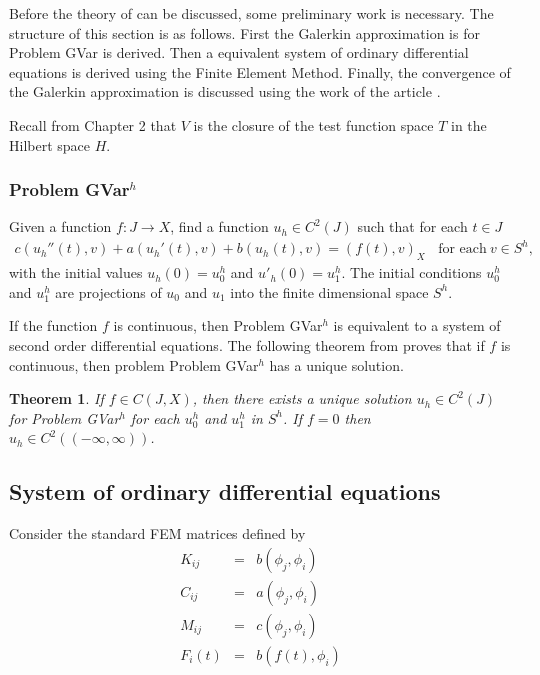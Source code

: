 \documentclass[../../main.tex]{subfiles}
\begin{document}
Before the theory of \cite{BV13} can be discussed, some preliminary work is
necessary. The structure of this section is as follows. First the Galerkin
approximation is for Problem GVar is derived. Then a equivalent system of
ordinary differential equations is derived using the Finite Element Method.
Finally, the convergence of the Galerkin approximation is discussed using the
work of the article \cite{BV13}.

Recall from Chapter 2 that $V$ is the closure of the test function space $T$ in
the Hilbert space $H$.

\subsubsection*{Problem GVar$^h$}
Given a function $f: J \rightarrow X$, find a function $u_h \in C^2(J)$ such that for each $t\in J$
\begin{eqnarray}
	c(u_h''(t),v)+a(u_h'(t),v)+b(u_h(t),v)= (f(t),v)_{X} \ \ \ \ \textrm{for each} \ v \in S^h, \label{DC_E2}
\end{eqnarray}
with the initial values $u_h(0)=u^h_{0}$ and $u'_h(0)=u^h_{1}$. The initial conditions $u^h_{0}$ and $u^h_{1}$ are projections of $u_0$ and $u_1$ into the finite dimensional space $S^h$.

If the function $f$ is continuous, then Problem GVar$^h$ is equivalent to a
system of second order differential equations. The following theorem from
\cite{BV13} proves that if $f$ is continuous, then problem Problem GVar$^h$ has
a unique solution.

\newtheorem{DC_Thm2}{Theorem}
\begin{DC_Thm2} \label{DC_THM2}
	If $f \in C(J,X)$, then there exists a unique solution $u_h \in C^2(J)$ for Problem GVar$^h$ for each $u_0^h$ and $u_1^h$ in $S^h$. If $f = 0$ then $u_h \in C^2((-\infty, \infty))$.
\end{DC_Thm2}

\subsection{System of ordinary differential equations}
Consider the standard FEM matrices defined by
\begin{eqnarray*}
	K_{ij} & = & b(\phi_j, \phi_i)\\
	C_{ij} & = & a(\phi_j, \phi_i)\\
	M_{ij} & = & c(\phi_j, \phi_i)\\
	F_{i}(t) & = & b(f(t), \phi_i)
\end{eqnarray*}
\end{document}

